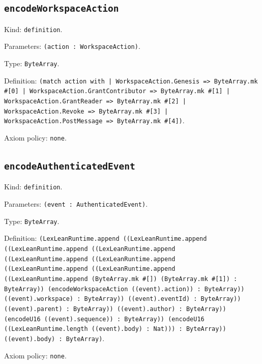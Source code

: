 \documentclass[11pt]{article}
\begin{document}
\subsection*{\texttt{encodeWorkspaceAction}}
\noindent Kind: \texttt{definition}.\par
\noindent Parameters: \texttt{(action : WorkspaceAction)}.\par
\noindent Type: \texttt{ByteArray}.\par
\noindent Definition: \texttt{(match action with | WorkspaceAction.Genesis => ByteArray.mk \#[0] | WorkspaceAction.GrantContributor => ByteArray.mk \#[1] | WorkspaceAction.GrantReader => ByteArray.mk \#[2] | WorkspaceAction.Revoke => ByteArray.mk \#[3] | WorkspaceAction.PostMessage => ByteArray.mk \#[4])}.\par
\noindent Axiom policy: \texttt{none}.\par
\subsection*{\texttt{encodeAuthenticatedEvent}}
\noindent Kind: \texttt{definition}.\par
\noindent Parameters: \texttt{(event : AuthenticatedEvent)}.\par
\noindent Type: \texttt{ByteArray}.\par
\noindent Definition: \texttt{(LexLeanRuntime.append ((LexLeanRuntime.append ((LexLeanRuntime.append ((LexLeanRuntime.append ((LexLeanRuntime.append ((LexLeanRuntime.append ((LexLeanRuntime.append ((LexLeanRuntime.append ((LexLeanRuntime.append (ByteArray.mk \#[]) (ByteArray.mk \#[1]) : ByteArray)) (encodeWorkspaceAction ((event).action)) : ByteArray)) ((event).workspace) : ByteArray)) ((event).eventId) : ByteArray)) ((event).parent) : ByteArray)) ((event).author) : ByteArray)) (encodeU16 ((event).sequence)) : ByteArray)) (encodeU16 ((LexLeanRuntime.length ((event).body) : Nat))) : ByteArray)) ((event).body) : ByteArray)}.\par
\noindent Axiom policy: \texttt{none}.\par
\end{document}
